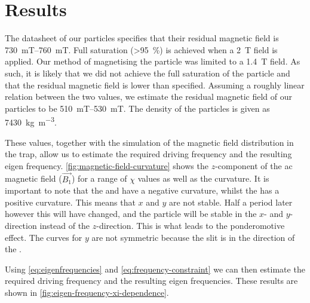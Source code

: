 \chapter{Results}
\label{chap:results}
The datasheet of our  particles specifies that their residual magnetic field is \qtyrange{730}{760}{\milli\tesla}. Full saturation (\qty{>95}{\percent}) is achieved when a \qty{2}{\tesla} field is applied\cite{magnequench}. Our method of magnetising the particle was limited to a \qty{1.4}{\tesla} field. As such, it is likely that we did not achieve the full saturation of the particle and that the residual magnetic field is lower than specified. Assuming a roughly linear relation between the two values, we estimate the residual magnetic field of our particles to be \qtyrange{510}{530}{\milli\tesla}. The density of the particles is given as \qty{7430}{\kilo\gram\per\cubic\meter}\cite{magnequench}.

These values, together with the simulation of the magnetic field distribution in the trap, allow us to estimate the required driving frequency and the resulting eigen frequency. \autoref{fig:magnetic-field-curvature} shows the $z$-component of the ac magnetic field ($\vec{B_1}$) for a range of $\chi$ values as well as the curvature. It is important to note that the \xmode and \ymode have a negative curvature, whilst the \zmode has a positive curvature. This means that $x$ and $y$ are not stable. Half a period later however this will have changed, and the particle will be stable in the $x$- and $y$-direction instead of the $z$-direction. This is what leads to the ponderomotive effect. The curves for $y$ are not symmetric because the slit is in the direction of the \ymode.

Using \autoref{eq:eigenfrequencies} and \autoref{eq:frequency-constraint} we can then estimate the required driving frequency and the resulting eigen frequencies. These results are shown in \autoref{fig:eigen-frequency-xi-dependence}.

